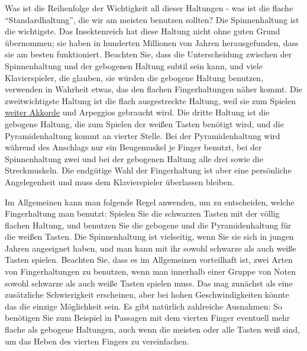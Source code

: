 Was ist die Reihenfolge der Wichtigkeit all dieser Haltungen - was ist die flache \enquote{Standardhaltung}, die wir am meisten benutzen sollten?
Die Spinnenhaltung ist die wichtigste.
Das Insektenreich hat diese Haltung nicht ohne guten Grund übernommen; sie haben in hunderten Millionen von Jahren herausgefunden, dass sie am besten funktioniert.
Beachten Sie, dass die Unterscheidung zwischen der Spinnenhaltung und der gebogenen Haltung subtil sein kann, und viele Klavierspieler, die glauben, sie würden die gebogene Haltung benutzen, verwenden in Wahrheit etwas, das den flachen Fingerhaltungen näher kommt.
Die zweitwichtigste Haltung ist die flach ausgestreckte Haltung, weil sie zum Spielen \hyperref[c1iii7e]{weiter Akkorde} und Arpeggios gebraucht wird.
Die dritte Haltung ist die gebogene Haltung, die zum Spielen der weißen Tasten benötigt wird, und die Pyramidenhaltung kommt an vierter Stelle.
Bei der Pyramidenhaltung wird während des Anschlags nur ein Beugemuskel je Finger benutzt, bei der Spinnenhaltung zwei und bei der gebogenen Haltung alle drei sowie die Streckmuskeln.
Die endgütige Wahl der Fingerhaltung ist aber eine persönliche Angelegenheit und muss dem Klavierspieler überlassen bleiben.

Im Allgemeinen kann man folgende Regel anwenden, um zu entscheiden, welche Fingerhaltung man benutzt:
Spielen Sie die schwarzen Tasten mit der völlig flachen Haltung, und benutzen Sie die gebogene und die Pyramidenhaltung für die weißen Tasten.
Die Spinnenhaltung ist vielseitig, wenn Sie sie sich in jungen Jahren angeeignet haben, und man kann mit ihr sowohl schwarze als auch weiße Tasten spielen.
Beachten Sie, dass es im Allgemeinen vorteilhaft ist, zwei Arten von Fingerhaltungen zu benutzen, wenn man innerhalb einer Gruppe von Noten sowohl schwarze als auch weiße Tasten spielen muss.
Das mag zunächst als eine zusätzliche Schwierigkeit erscheinen, aber bei hohen Geschwindigkeiten könnte das die einzige Möglichkeit sein.
Es gibt natürlich zahlreiche Ausnahmen: So benötigen Sie zum Beispiel in Passagen mit dem vierten Finger eventuell mehr flache als gebogene Haltungen, auch wenn die meisten oder alle Tasten weiß sind, um das Heben des vierten Fingers zu vereinfachen.


